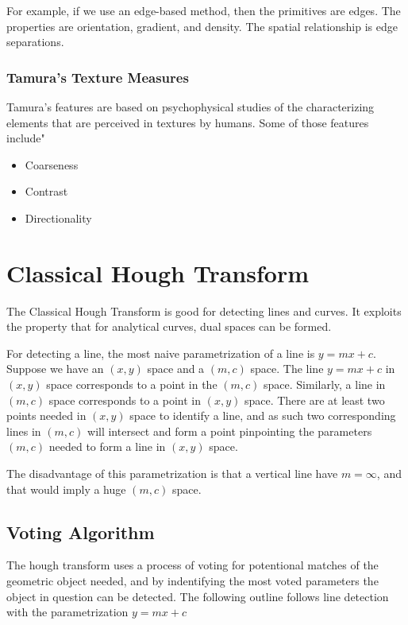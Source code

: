 \documentclass{article}
\begin{document}
\begin{multicols}{2}
For example, if we use an edge-based method, then the primitives are edges. The properties are orientation, gradient, and density. The spatial relationship is edge separations.

\subsubsection{Tamura's Texture Measures}

Tamura's features are based on psychophysical studies of the characterizing elements that are perceived in textures by humans. Some of those features include"

\begin{itemize}
  \item {Coarseness}
  \item {Contrast}
  \item {Directionality}
\end{itemize}

\section{Classical Hough Transform}

The Classical Hough Transform is good for detecting lines and curves. It exploits the property that for analytical curves, dual spaces can be formed.

For detecting a line, the most naive parametrization of a line is $y = mx + c$. Suppose we have an $(x,y)$ space and a $(m,c)$ space. The line $y = mx + c$ in $(x,y)$ space corresponds to a point in the $(m,c)$ space. Similarly, a line in $(m,c)$ space corresponds to a point in $(x,y)$ space. There are at least two points needed in $(x,y)$ space to identify a line, and as such two corresponding lines in $(m,c)$ will intersect and form a point pinpointing the parameters $(m,c)$ needed to form a line in $(x,y)$ space.

The disadvantage of this parametrization is that a vertical line have $m = \infty$, and that would imply a huge $(m, c)$ space.

\subsection{Voting Algorithm}

The hough transform uses a process of voting for potentional matches of the geometric object needed, and by indentifying the most voted parameters the object in question can be detected. The following outline follows line detection with the parametrization $y = mx + c$


\end{multicols}
\end{document}

